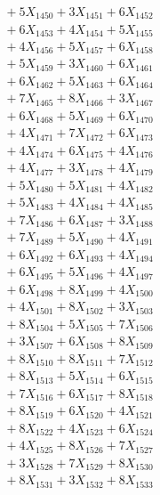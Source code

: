 \documentclass[a4paper,10pt]{article}
\begin{document}
{\begin{align}
&\;  + 5 X_{1450} + 3 X_{1451} + 6 X_{1452} \\[0.3ex]
&\;  + 6 X_{1453} + 4 X_{1454} + 5 X_{1455} \\[0.3ex]
&\;  + 4 X_{1456} + 5 X_{1457} + 6 X_{1458} \\[0.3ex]
&\;  + 5 X_{1459} + 3 X_{1460} + 6 X_{1461} \\[0.3ex]
&\;  + 6 X_{1462} + 5 X_{1463} + 6 X_{1464} \\[0.3ex]
&\;  + 7 X_{1465} + 8 X_{1466} + 3 X_{1467} \\[0.3ex]
&\;  + 6 X_{1468} + 5 X_{1469} + 6 X_{1470} \\[0.3ex]
&\;  + 4 X_{1471} + 7 X_{1472} + 6 X_{1473} \\[0.3ex]
&\;  + 4 X_{1474} + 6 X_{1475} + 4 X_{1476} \\[0.3ex]
&\;  + 4 X_{1477} + 3 X_{1478} + 4 X_{1479} \\[0.5ex]\allowbreak
&\;  + 5 X_{1480} + 5 X_{1481} + 4 X_{1482} \\[0.3ex]
&\;  + 5 X_{1483} + 4 X_{1484} + 4 X_{1485} \\[0.3ex]
&\;  + 7 X_{1486} + 6 X_{1487} + 3 X_{1488} \\[0.3ex]
&\;  + 7 X_{1489} + 5 X_{1490} + 4 X_{1491} \\[0.3ex]
&\;  + 6 X_{1492} + 6 X_{1493} + 4 X_{1494} \\[0.3ex]
&\;  + 6 X_{1495} + 5 X_{1496} + 4 X_{1497} \\[0.3ex]
&\;  + 6 X_{1498} + 8 X_{1499} + 4 X_{1500} \\[0.3ex]
&\;  + 4 X_{1501} + 8 X_{1502} + 3 X_{1503} \\[0.3ex]
&\;  + 8 X_{1504} + 5 X_{1505} + 7 X_{1506} \\[0.3ex]
&\;  + 3 X_{1507} + 6 X_{1508} + 8 X_{1509} \\[0.5ex]\allowbreak
&\;  + 8 X_{1510} + 8 X_{1511} + 7 X_{1512} \\[0.3ex]
&\;  + 8 X_{1513} + 5 X_{1514} + 6 X_{1515} \\[0.3ex]
&\;  + 7 X_{1516} + 6 X_{1517} + 8 X_{1518} \\[0.3ex]
&\;  + 8 X_{1519} + 6 X_{1520} + 4 X_{1521} \\[0.3ex]
&\;  + 8 X_{1522} + 4 X_{1523} + 6 X_{1524} \\[0.3ex]
&\;  + 4 X_{1525} + 8 X_{1526} + 7 X_{1527} \\[0.3ex]
&\;  + 3 X_{1528} + 7 X_{1529} + 8 X_{1530} \\[0.3ex]
&\;  + 8 X_{1531} + 3 X_{1532} + 8 X_{1533} \\[0.3ex]

\end{align}}
\end{document}

